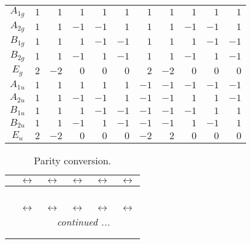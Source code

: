 \documentclass[fleqn,10pt,landscape]{article}
\begin{document}
\begin{itemize}
\begin{center}
\begin{longtable}{c|rrrrrrrrrr}
$ A_{1g} $ & $ 1 $ & $ 1 $ & $ 1 $ & $ 1 $ & $ 1 $ & $ 1 $ & $ 1 $ & $ 1 $ & $ 1 $ & $ 1 $ \\
$ A_{2g} $ & $ 1 $ & $ 1 $ & $ -1 $ & $ -1 $ & $ 1 $ & $ 1 $ & $ 1 $ & $ -1 $ & $ -1 $ & $ 1 $ \\
$ B_{1g} $ & $ 1 $ & $ 1 $ & $ 1 $ & $ -1 $ & $ -1 $ & $ 1 $ & $ 1 $ & $ 1 $ & $ -1 $ & $ -1 $ \\
$ B_{2g} $ & $ 1 $ & $ 1 $ & $ -1 $ & $ 1 $ & $ -1 $ & $ 1 $ & $ 1 $ & $ -1 $ & $ 1 $ & $ -1 $ \\
$ E_{g} $ & $ 2 $ & $ -2 $ & $ 0 $ & $ 0 $ & $ 0 $ & $ 2 $ & $ -2 $ & $ 0 $ & $ 0 $ & $ 0 $ \\
$ A_{1u} $ & $ 1 $ & $ 1 $ & $ 1 $ & $ 1 $ & $ 1 $ & $ -1 $ & $ -1 $ & $ -1 $ & $ -1 $ & $ -1 $ \\
$ A_{2u} $ & $ 1 $ & $ 1 $ & $ -1 $ & $ -1 $ & $ 1 $ & $ -1 $ & $ -1 $ & $ 1 $ & $ 1 $ & $ -1 $ \\
$ B_{1u} $ & $ 1 $ & $ 1 $ & $ 1 $ & $ -1 $ & $ -1 $ & $ -1 $ & $ -1 $ & $ -1 $ & $ 1 $ & $ 1 $ \\
$ B_{2u} $ & $ 1 $ & $ 1 $ & $ -1 $ & $ 1 $ & $ -1 $ & $ -1 $ & $ -1 $ & $ 1 $ & $ -1 $ & $ 1 $ \\
$ E_{u} $ & $ 2 $ & $ -2 $ & $ 0 $ & $ 0 $ & $ 0 $ & $ -2 $ & $ 2 $ & $ 0 $ & $ 0 $ & $ 0 $ \\
\end{longtable}
\end{center}
\begin{center}
\renewcommand{\arraystretch}{1.0}
\begin{longtable}{cccccc}
\caption{Parity conversion.}
 \\
 \hline \hline
 & $\leftrightarrow$ & $\leftrightarrow$ & $\leftrightarrow$ & $\leftrightarrow$ & $\leftrightarrow$ \\ \hline \endfirsthead

\multicolumn{5}{l}{\tablename\ \thetable{}} \\
 \hline \hline
 & $\leftrightarrow$ & $\leftrightarrow$ & $\leftrightarrow$ & $\leftrightarrow$ & $\leftrightarrow$ \\ \hline \endhead

 \hline \hline
\multicolumn{5}{r}{\footnotesize\it continued ...} \\ \endfoot

 \hline \hline
\multicolumn{5}{r}{} \\ \endlastfoot


\end{longtable}
\end{center}
\end{itemize}
\end{document}
